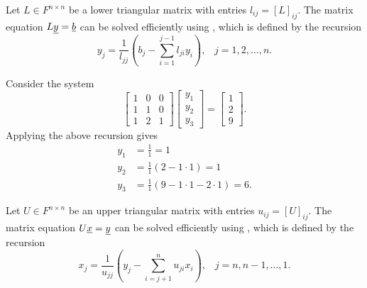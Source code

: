 Let $L \in F^{n \times n}$ be a lower triangular matrix with entries $l_{ij} = [ L ]_{ij}$.
The matrix equation $L \underline{y} = \underline{b}$ can be solved efficiently using , which is defined by the recursion
\begin{equation*}
y_j = \frac{1}{l_{jj}} \left( b_j - \sum_{i=1}^{j-1} l_{ji} y_i \right), \;\;\; j=1,2,\ldots,n.
\end{equation*}

\begin{example}
Consider the system
\begin{equation*}
\begin{bmatrix} 1 & 0 & 0 \\ 1 & 1 & 0 \\ 1 & 2 & 1 \end{bmatrix}
\begin{bmatrix} y_1 \\ y_2 \\ y_3 \end{bmatrix}
= \begin{bmatrix} 1 \\ 2 \\ 9 \end{bmatrix} .
\end{equation*}
Applying the above recursion gives
\begin{align*}
y_1 & = \frac{1}{1}  = 1 \\
y_2 & = \frac{1}{1} (2 - 1\cdot 1)  = 1 \\
y_3 & = \frac{1}{1} (9 - 1\cdot 1 - 2\cdot 1) = 6.
\end{align*}
\end{example}

Let $U \in F^{n \times n}$ be an upper triangular matrix with entries $u_{ij} = [ U ]_{ij}$.
The matrix equation $U \underline{x} = \underline{y}$ can be solved efficiently using , which is defined by the recursion
\begin{equation*}
x_j = \frac{1}{u_{jj}} \left( y_j - \sum_{i=j+1}^{n} u_{ji} x_i \right), \;\;\; j=n,n-1,\ldots,1.
\end{equation*}

